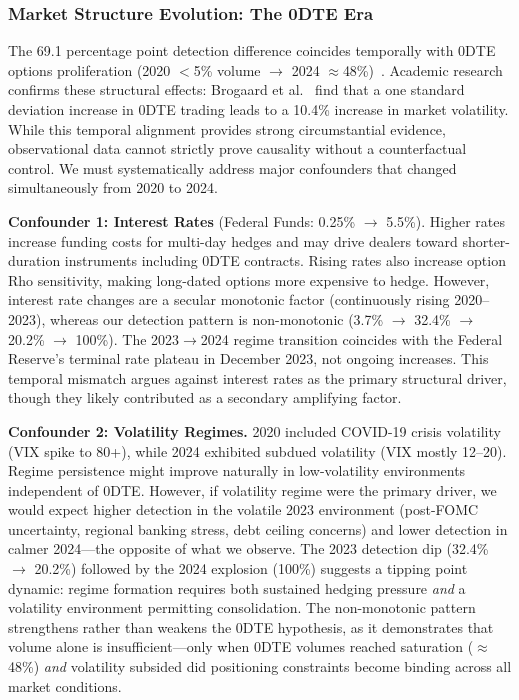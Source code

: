 \subsubsection{Market Structure Evolution: The 0DTE Era}

The 69.1 percentage point detection difference coincides temporally with 0DTE options proliferation (2020 $<$5\% volume $\rightarrow$ 2024 $\approx$48\%)~\cite{cboe2024zero}. Academic research confirms these structural effects: Brogaard et al.~\cite{brogaard2023does} find that a one standard deviation increase in 0DTE trading leads to a 10.4\% increase in market volatility. While this temporal alignment provides strong circumstantial evidence, observational data cannot strictly prove causality without a counterfactual control. We must systematically address major confounders that changed simultaneously from 2020 to 2024.

\textbf{Confounder 1: Interest Rates} (Federal Funds: 0.25\% $\rightarrow$ 5.5\%). Higher rates increase funding costs for multi-day hedges and may drive dealers toward shorter-duration instruments including 0DTE contracts. Rising rates also increase option Rho sensitivity, making long-dated options more expensive to hedge. However, interest rate changes are a secular monotonic factor (continuously rising 2020--2023), whereas our detection pattern is non-monotonic (3.7\% $\rightarrow$ 32.4\% $\rightarrow$ 20.2\% $\rightarrow$ 100\%). The 2023$\rightarrow$2024 regime transition coincides with the Federal Reserve's terminal rate plateau in December 2023, not ongoing increases. This temporal mismatch argues against interest rates as the primary structural driver, though they likely contributed as a secondary amplifying factor.

\textbf{Confounder 2: Volatility Regimes.} 2020 included COVID-19 crisis volatility (VIX spike to 80+), while 2024 exhibited subdued volatility (VIX mostly 12--20). Regime persistence might improve naturally in low-volatility environments independent of 0DTE. However, if volatility regime were the primary driver, we would expect higher detection in the volatile 2023 environment (post-FOMC uncertainty, regional banking stress, debt ceiling concerns) and lower detection in calmer 2024---the opposite of what we observe. The 2023 detection dip (32.4\% $\rightarrow$ 20.2\%) followed by the 2024 explosion (100\%) suggests a tipping point dynamic: regime formation requires both sustained hedging pressure \textit{and} a volatility environment permitting consolidation. The non-monotonic pattern strengthens rather than weakens the 0DTE hypothesis, as it demonstrates that volume alone is insufficient---only when 0DTE volumes reached saturation ($\approx$48\%) \textit{and} volatility subsided did positioning constraints become binding across all market conditions.

